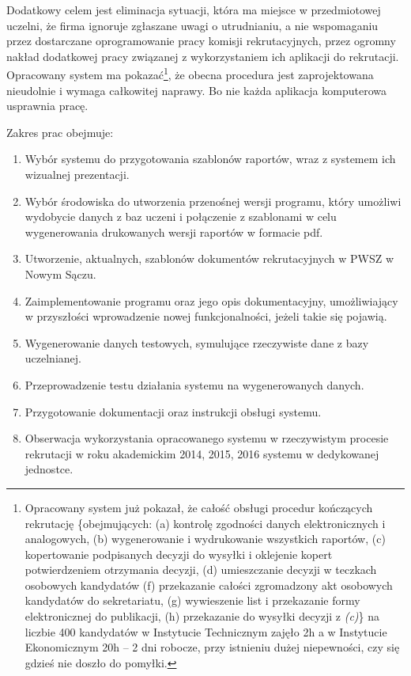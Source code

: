 Dodatkowy celem jest eliminacja sytuacji, która ma miejsce w przedmiotowej uczelni, że  firma ignoruje zgłaszane uwagi o utrudnianiu, a nie wspomaganiu przez dostarczane oprogramowanie pracy komisji rekrutacyjnych, przez ogromny nakład dodatkowej pracy związanej z wykorzystaniem ich aplikacji do rekrutacji. Opracowany system ma pokazać\footnote{Opracowany system już pokazał, że całość obsługi procedur kończących rekrutację \{obejmujących: (a) kontrolę zgodności danych elektronicznych i analogowych, (b) wygenerowanie i wydrukowanie wszystkich raportów, (c) kopertowanie podpisanych decyzji do wysyłki i oklejenie kopert potwierdzeniem otrzymania decyzji, (d) umieszczanie decyzji w teczkach osobowych kandydatów (f) przekazanie całości zgromadzony akt osobowych kandydatów do sekretariatu,  (g) wywieszenie list i przekazanie formy elektronicznej do publikacji, (h) przekazanie do wysyłki decyzji z \emph{(c)}\} na liczbie 400 kandydatów w Instytucie Technicznym zajęło 2h a w Instytucie Ekonomicznym 20h -- 2 dni robocze, przy istnieniu dużej niepewności, czy się gdzieś nie doszło do pomyłki.}, że obecna procedura jest zaprojektowana nieudolnie i wymaga całkowitej naprawy. Bo nie każda aplikacja komputerowa usprawnia pracę.

Zakres prac obejmuje:
\begin{enumerate}
\item Wybór systemu do przygotowania szablonów raportów, wraz z systemem ich wizualnej prezentacji.
\item Wybór środowiska do utworzenia przenośnej wersji programu, który umożliwi wydobycie danych z baz uczeni i połączenie z szablonami w celu wygenerowania drukowanych wersji raportów w formacie pdf.
\item Utworzenie, aktualnych, szablonów dokumentów rekrutacyjnych w PWSZ w Nowym Sączu.
\item Zaimplementowanie programu oraz jego opis dokumentacyjny, umożliwiający w przyszłości wprowadzenie nowej funkcjonalności, jeżeli takie się pojawią.
\item Wygenerowanie danych testowych, symulujące rzeczywiste dane z bazy uczelnianej.
\item Przeprowadzenie testu działania systemu na wygenerowanych danych.
\item Przygotowanie dokumentacji oraz instrukcji obsługi systemu.
\item Obserwacja wykorzystania opracowanego systemu w rzeczywistym procesie rekrutacji w roku akademickim 2014, 2015, 2016 systemu w dedykowanej jednostce.
\end{enumerate}

